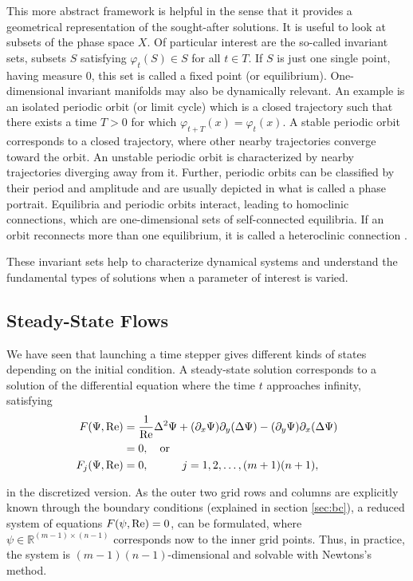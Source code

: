 This more abstract framework is helpful in the sense that it provides a
geometrical representation of the sought-after solutions. It is useful to look
at subsets of the phase space $X$. Of particular interest are the so-called
invariant sets, subsets $S$ satisfying $\varphi_t(S) \in S$ for all $t \in T$.
If $S$ is just one single point, having measure $0$, this set is called a fixed
point (or equilibrium). One-dimensional invariant manifolds may also be
dynamically relevant. An example is an isolated periodic orbit (or limit cycle)
which is a closed trajectory such that there exists a time $T > 0$ for which
$\varphi_{t+T}(x) = \varphi_{t}(x)$. A stable periodic orbit corresponds to a
closed trajectory, where other nearby trajectories converge toward the orbit.
An unstable periodic orbit is characterized by nearby trajectories diverging
away from it. Further, periodic orbits can be classified by their period and
amplitude and are usually depicted in what is called a phase portrait.
Equilibria and periodic orbits interact, leading to homoclinic connections,
which are one-dimensional sets of self-connected equilibria. If an orbit
reconnects more than one equilibrium, it is called a heteroclinic connection
\citep{kuznetsov2004}.

These invariant sets help to characterize dynamical systems and understand the
fundamental types of solutions when a parameter of interest is varied.


\subsection{Steady-State Flows}

We have seen that launching a time stepper gives different kinds of states
depending on the initial condition. A steady-state solution corresponds to a
solution of the differential equation where the time $t$ approaches infinity,
satisfying
\begin{align}
  F(\Psi, \mathrm{Re}) &= \frac{1}{\mathrm{Re}}\Delta^2 \Psi +
    (\partial_x \Psi) \partial_y(\Delta \Psi) -
    (\partial_y \Psi) \partial_x(\Delta \Psi) \nonumber \\
  & =  0, \quad \text{or} \\
  F_j(\Psi, \mathrm{Re}) &= 0, \quad \quad \quad 
  j= 1,2,\dots,(m+1)(n+1), \label{eq:str_steady}
\end{align}

in the discretized version. As the outer two grid rows and columns are
explicitly known through the boundary conditions (explained in section
\ref{sec:bc}), a reduced system of equations $F(\psi, \mathrm{Re}) = 0$, can be
formulated, where $\psi \in \mathbb{R}^{(m-1)\times(n-1)} $ corresponds now to
the inner grid points. Thus, in practice, the system is
$(m-1)(n-1)$-dimensional and solvable with Newtons's method.

